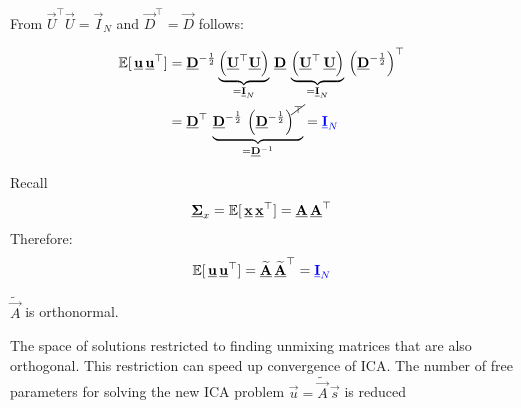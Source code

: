 \begin{frame}


From $\vec U^\top\vec U = \vec I_N$ and $\vec D^\top = \vec D$ follows:

\begin{align}
\mathbb{E} \lbrack\, \underline{\mathbf{u}} \, \underline{\mathbf{u}}^\top \rbrack
&=
\underline{\mathbf{D}}^{-\frac{1}{2}}
\underbrace{\left( \underline{\mathbf{U}}^\top  \underline{\mathbf{U}} \right)}_{= \underline{\mathbf{I}}_N}
\, \underline{\mathbf{D}} \, 
\underbrace{\left( \underline{\mathbf{U}}^\top \,  \underline{\mathbf{U}} \right)}_{= \underline{\mathbf{I}}_N}
\,
\left(\underline{\mathbf{D}}^{-\frac{1}{2}} \right)^\top \\
&= \underline{\mathbf{D}}^{\top}
\, 
\underbrace{\underline{\mathbf{D}}^{-\frac{1}{2}}  \, 
\left(\underline{\mathbf{D}}^{-\frac{1}{2}} \right)^{\cancel{\top}}}_{=\underline{\mathbf{D}}^{-1}} = {\color{blue}\underline{\mathbf{I}}_N}
\end{align}


Recall 
\begin{equation}
\underline{\mathbf{\Sigma}}_x =  \mathbb{E} \lbrack \, \underline{\mathbf{x}} \, \underline{\mathbf{x}}^\top \rbrack
=  \underline{\mathbf{A}}\, \underline{\mathbf{A}}^\top
\end{equation}
Therefore:
\begin{equation}
\mathbb{E} \lbrack \, \underline{\mathbf{u}} \, \underline{\mathbf{u}}^\top \rbrack
= \widetilde {\underline{\mathbf{A}}}\, \widetilde {\underline{\mathbf{A}}}^\top = {\color{blue}\underline{\mathbf{I}}_N}
\end{equation}

$\widetilde{\vec A}$ is orthonormal.\\

\end{frame}

\begin{frame}{\subsecname}


\pause

\svspace{5mm}

The space of solutions restricted to finding unmixing matrices that are also orthogonal.
This restriction can speed up convergence of ICA. 
The number of free parameters for solving the new ICA problem 
$\vec u = \widetilde{\vec A}\, \vec s$
is reduced
\end{frame}

